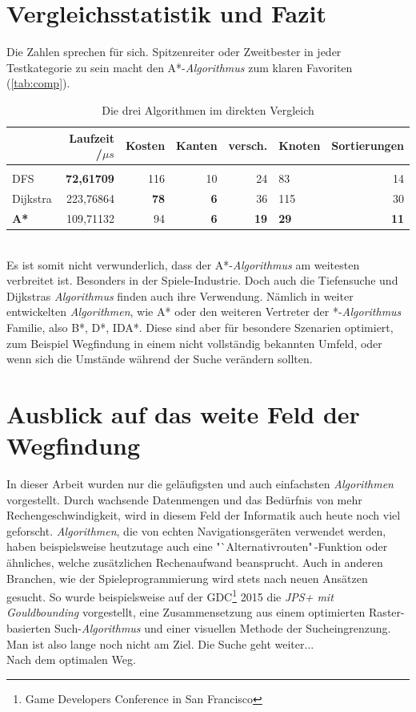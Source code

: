 \documentclass[12pt]{article}
\begin{document}
\section{Vergleichsstatistik und Fazit}
Die Zahlen sprechen für sich. Spitzenreiter oder Zweitbester in jeder Testkategorie zu sein macht den A*-\textit{Algorithmus} zum klaren Favoriten (\autoref{tab:comp}). 
\begin{table}[h!]
\centering
\caption{Die drei Algorithmen im direkten Vergleich}
\label{tab:comp}
\vspace{10pt}
\begin{tabular*}{\textwidth}{@{\extracolsep{\fill}} lrrrrlr}
	             & Laufzeit /$\mu s$  & Kosten      & Kanten     & versch.      & Knoten      & Sortierungen \\
\hline
\hline
\\
DFS	             & \textbf{72,61709}  & 116         & 10 	     & 24	        & 83          & 14           \\
Dijkstra         & 223,76864          & \textbf{78} & \textbf{6} & 36	        & 115         & 30 	         \\
\textbf{A*}	     & 109,71132 	      & 94          & \textbf{6} & \textbf{19}	& \textbf{29} & \textbf{11}  \\ 
\hline
\end{tabular*} 
\end{table}
\\
Es ist somit nicht verwunderlich, dass der A*-\textit{Algorithmus} am weitesten verbreitet ist. Besonders in der Spiele-Industrie. Doch auch die Tiefensuche und Dijkstras \textit{Algorithmus} finden auch ihre Verwendung. Nämlich in weiter entwickelten \textit{Algorithmen}, wie A* oder den weiteren Vertreter der *-\textit{Algorithmus} Familie, also B*, D*, IDA*. Diese sind aber für besondere Szenarien optimiert, zum Beispiel Wegfindung in einem nicht vollständig bekannten Umfeld, oder wenn sich die Umstände während der Suche verändern sollten.
\section{Ausblick auf das weite Feld der Wegfindung}
In dieser Arbeit wurden nur die geläufigsten und auch einfachsten \textit{Algorithmen} vorgestellt. Durch wachsende Datenmengen und das Bedürfnis von mehr Rechengeschwindigkeit, wird in diesem Feld der Informatik auch heute noch viel geforscht. \textit{Algorithmen}, die von echten Navigationsgeräten verwendet werden, haben beispielsweise heutzutage auch eine "`Alternativrouten"\,-Funktion oder ähnliches, welche zusätzlichen Rechenaufwand beansprucht. Auch in anderen Branchen, wie der Spieleprogrammierung wird stets nach neuen Ansätzen gesucht. So wurde beispielsweise auf der GDC\footnote{Game Developers Conference in San Francisco} 2015 die \textit{JPS+ mit Gouldbounding}\cite{jps} vorgestellt, eine Zusammensetzung aus einem optimierten Raster-basierten Such-\textit{Algorithmus} und einer visuellen Methode der Sucheingrenzung. 
\\
Man ist also lange noch nicht am Ziel. Die Suche geht weiter... \\
Nach dem optimalen Weg.
\newpage
\end{document}
